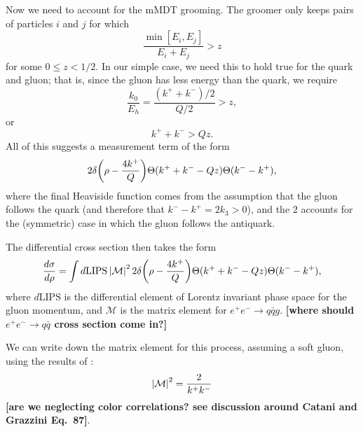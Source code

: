 \documentclass[11pt,twoside,reqno]{amsart}
\theoremstyle{plain}
\theoremstyle{remark}
\theoremstyle{definition}
\theoremstyle{remark}
\theoremstyle{definition}
\theoremstyle{definition}
\newcommand{\cM}{\mathcal{M}}
\newcommand{\LIPS}{\mathrm{LIPS}}
\begin{document}
Now we need to account for the mMDT grooming. The groomer only keeps pairs of particles $i$ and $j$ for which \cite{kardos_two-_2020}
\begin{equation}
	\frac{\min[E_i, E_j]}{E_i + E_j} > z
\end{equation}
for some $0 \le z < 1/2$. In our simple case, we need this to hold true for the quark and gluon; that is, since the gluon has less energy than the quark, we require
\begin{equation}
	\frac{k_0}{E_h} = \frac{(k^+ + k^-)/2}{Q/2} > z,
\end{equation}
or
\begin{equation}
	k^+ + k^- > Q z.
\end{equation}
All of this suggests a measurement term of the form
\begin{equation}
	2\delta\qty(\rho - \frac{4 k^+}{Q})\Theta(k^+ + k^- - Qz)\Theta(k^- - k^+),
\end{equation}
where the final Heaviside function comes from the assumption that the gluon follows the quark (and therefore that $k^- - k^+ = 2k_3 > 0$), and the $2$ accounts for the (symmetric) case in which the gluon follows the antiquark.

The differential cross section then takes the form
\begin{equation}\label{eq:cross section}
\begin{aligned}
	\frac{d\sigma}{d\rho} = \int d\LIPS\,\abs{\cM}^2 \, 2\delta\qty(\rho - \frac{4 k^+}{Q})\Theta(k^+ + k^- - Qz)\Theta(k^- - k^+),
\end{aligned}
\end{equation}
where $d\LIPS$ is the differential element of Lorentz invariant phase space for the gluon momentum, and $\cM$ is the matrix element for $e^+ e^- \to q\bar q g$. {\color{red}\textbf{[where should $e^+ e^- \to q \bar q$ cross section come in?]}}

We can write down the matrix element for this process, assuming a soft gluon, using the results of \cite{catani_infrared_2000}:
\begin{equation}\label{eq:matrix element}
	\abs{\cM}^2 = \frac{2}{k^+ k^-}
\end{equation}
{\color{red}\textbf{[are we neglecting color correlations? see discussion around Catani and Grazzini Eq.\ 87]}}.
\end{document}

